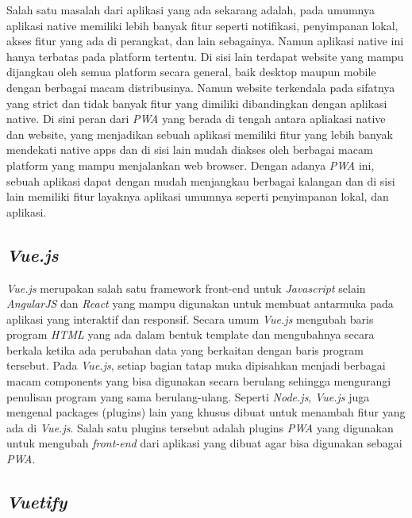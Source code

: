 Salah satu masalah dari aplikasi yang ada sekarang adalah, pada umumnya aplikasi native memiliki lebih banyak fitur seperti notifikasi, penyimpanan lokal, akses fitur yang ada di perangkat, dan lain sebagainya.
Namun aplikasi native ini hanya terbatas pada platform tertentu.
Di sisi lain terdapat website yang mampu dijangkau oleh semua platform secara general, baik desktop maupun mobile dengan berbagai macam distribusinya.
Namun website terkendala pada sifatnya yang strict dan tidak banyak fitur yang dimiliki dibandingkan dengan aplikasi native.
Di sini peran dari \emph{PWA} yang berada di tengah antara apliakasi native dan website, yang menjadikan sebuah aplikasi memiliki fitur yang lebih banyak mendekati native apps dan di sisi lain mudah diakses oleh berbagai macam platform yang mampu menjalankan web browser.
Dengan adanya \emph{PWA} ini, sebuah aplikasi dapat dengan mudah menjangkau berbagai kalangan dan di sisi lain memiliki fitur layaknya aplikasi umumnya seperti penyimpanan lokal, dan aplikasi.
\vspace{0.5ex}

\newpage

\subsection{\emph{Vue.js}}
\vspace{1ex}

\emph{Vue.js} merupakan salah satu framework front-end untuk \emph{Javascript} selain \emph{AngularJS} dan \emph{React} yang mampu digunakan untuk membuat antarmuka pada aplikasi yang interaktif dan responsif.
Secara umum \emph{Vue.js} mengubah baris program \emph{HTML} yang ada dalam bentuk template dan mengubahnya secara berkala ketika ada perubahan data yang berkaitan dengan baris program tersebut.
Pada \emph{Vue.js}, setiap bagian tatap muka dipisahkan menjadi berbagai macam components yang bisa digunakan secara berulang sehingga mengurangi penulisan program yang sama berulang-ulang.
Seperti \emph{Node.js}, \emph{Vue.js} juga mengenal packages (plugins) lain yang khusus dibuat untuk menambah fitur yang ada di \emph{Vue.js}.
Salah satu plugins tersebut adalah plugins \emph{PWA} yang digunakan untuk mengubah \emph{front-end} dari aplikasi yang dibuat agar bisa digunakan sebagai \emph{PWA}.
\vspace{0.5ex}

\subsection{\emph{Vuetify}}
\vspace{1ex}


